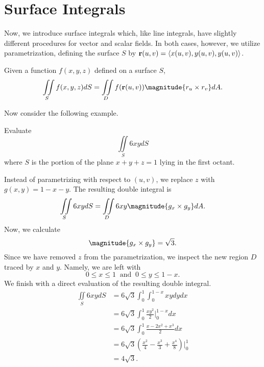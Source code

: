 \section{Surface Integrals}

Now, we introduce surface integrals which, like line integrals, have slightly different procedures for vector and scalar fields. In both cases, however, we utilize parametrization, defining the surface $S$ by $\mathbf{r}(u, v) = \left<x(u, v), y(u, v), y(u, v)\right>$.

\begin{definition}
    Given a function $f(x, y, z)$ defined on a surface $S$,
    \[\iint\limits_{S}f(x, y, z)dS = \iint\limits_{D}f(\bvec{r}(u, v))\magnitude{r_{u} \times r_{v}}dA.\]
\end{definition}

Now consider the following example.

\begin{example}
    Evaluate
    \[\iint\limits_{S}6xydS\]
    where $S$ is the portion of the plane $x + y + z = 1$ lying in the first octant.

    \begin{soln}
        Instead of parametrizing with respect to $(u, v)$, we replace $z$ with $g(x, y) = 1 - x - y$. The resulting double integral is
        \[\iint\limits_{S}6xydS = \iint\limits_{D}6xy\magnitude{g_{x} \times g_{y}}dA.\]
        Now, we calculate
        \[\magnitude{g_{x} \times g_{y}} = \sqrt{3}.\]
        Since we have removed $z$ from the parametrization, we inspect the new region $D$ traced by $x$ and $y$. Namely, we are left with
        \[0 \leq x \leq 1 \;\; \text{and} \;\; 0 \leq y \leq 1 - x.\]
        We finish with a direct evaluation of the resulting double integral.
        \begin{align*}
            \iint\limits_{S}6xydS &= 6\sqrt{3}\int_{0}^{1}\int_{0}^{1 - x}xydydx \\
            &= 6\sqrt{3}\int_{0}^{1}\frac{xy^{2}}{2}\biggr\rvert_{0}^{1 - x}dx \\
            &= 6\sqrt{3}\int_{0}^{1}\frac{x - 2x^{2} + x^{3}}{2}dx \\
            &= 6\sqrt{3}\left(\frac{x^{2}}{4} - \frac{x^{3}}{3} + \frac{x^{4}}{8}\right)\biggr\rvert_{0}^{1} \\
            &= 4\sqrt{3}.
        \end{align*}
    \end{soln}
\end{example}

